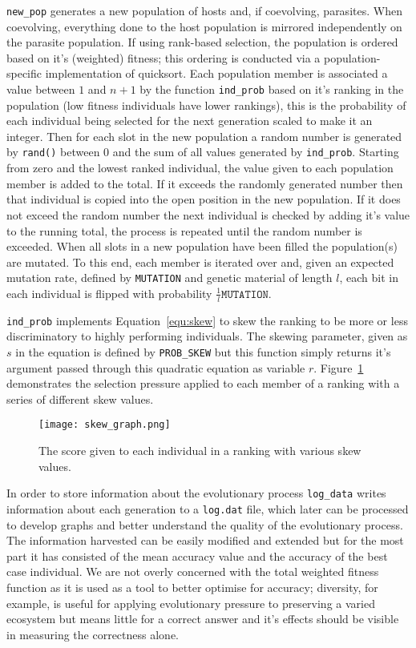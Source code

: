 \texttt{new\_pop} generates a new population of hosts and, if coevolving, parasites.
When coevolving, everything done to the host population is mirrored independently
on the parasite population. If using rank-based selection, the population is ordered
based on it's (weighted) fitness; this ordering is conducted via a
population-specific implementation of quicksort. Each population member is associated
a value between $1$ and $n+1$ by the function \texttt{ind\_prob} based on it's ranking
in the population (low fitness individuals have lower rankings), this is the
probability of each individual being selected for the next generation scaled to make
it an integer. Then for each slot in the new population a
random number is generated by \texttt{rand()} between 0 and the sum of all values
generated by \texttt{ind\_prob}.
Starting from zero and the lowest ranked individual, the value given to each population
member is added to the total. If it exceeds the randomly generated number then that
individual is copied into the open position in the new population. If it does not exceed
the random number the next individual is checked by adding it's value to the running total,
the process is repeated until the random number is exceeded. When all slots in a new
population have been filled the population(s) are mutated. To this end, each member is
iterated over and, given an expected mutation rate, defined by \texttt{MUTATION} and
genetic material of length $l$, each bit in each individual is flipped with probability
$\frac{1}{l}\texttt{MUTATION}$.

\texttt{ind\_prob} implements Equation~\ref{equ:skew} to skew the ranking to
be more or less discriminatory to highly performing individuals. The skewing
parameter, given as $s$ in the equation is defined by \texttt{PROB\_SKEW} but
this function simply returns it's argument passed through this quadratic equation as
variable $r$. Figure~\ref{fig:skew_plot} demonstrates the selection pressure applied
to each member of a ranking with a series of different skew values.

\begin{figure}
	\centering
	\texttt{[image: skew\_graph.png]}
	\caption{The score given to each individual in a ranking with various
	skew values.}
	\label{fig:skew_plot}
\end{figure}

In order to store information about the evolutionary process \texttt{log\_data}
writes information about each generation to a \texttt{log.dat} file, which later
can be processed to develop graphs and better understand the quality of the
evolutionary process. The information harvested can be easily modified and
extended but for the most part it has consisted of the mean accuracy value
and the accuracy of the best case individual.
We are not overly concerned with the total weighted fitness function as it
is used as a tool to better optimise for accuracy; diversity, for
example, is useful for applying evolutionary pressure to preserving a varied
ecosystem but means little for a correct answer and it's effects should be
visible in measuring the correctness alone.

